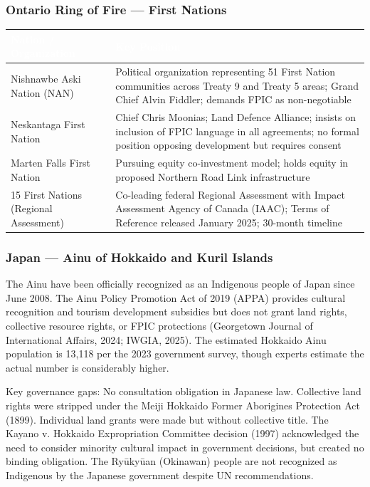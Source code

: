 \documentclass[11pt,letterpaper]{article}
\newcommand{\tableheader}[1]{\textbf{\sffamily\textcolor{white}{#1}}}
\begin{document}
\subsubsection{Ontario Ring of Fire --- First Nations}

\begin{center}
\begin{tabularx}{\textwidth}{L{3.5cm}X}
\toprule
{}
\tableheader{Nation / Organization} & \tableheader{Key Position} \\
\midrule
Nishnawbe Aski Nation (NAN) & Political organization representing 51 First Nation communities across Treaty 9 and Treaty 5 areas; Grand Chief Alvin Fiddler; demands FPIC as non-negotiable \\
Neskantaga First Nation & Chief Chris Moonias; Land Defence Alliance; insists on inclusion of FPIC language in all agreements; no formal position opposing development but requires consent \\
Marten Falls First Nation & Pursuing equity co-investment model; holds equity in proposed Northern Road Link infrastructure \\
15 First Nations (Regional Assessment) & Co-leading federal Regional Assessment with Impact Assessment Agency of Canada (IAAC); Terms of Reference released January 2025; 30-month timeline \\
\bottomrule
\end{tabularx}
\end{center}

\subsubsection{Japan --- Ainu of Hokkaido and Kuril Islands}

The Ainu have been officially recognized as an Indigenous people of Japan since June 2008. The Ainu Policy Promotion Act of 2019 (APPA) provides cultural recognition and tourism development subsidies but does not grant land rights, collective resource rights, or FPIC protections (Georgetown Journal of International Affairs, 2024; IWGIA, 2025). The estimated Hokkaido Ainu population is 13,118 per the 2023 government survey, though experts estimate the actual number is considerably higher.

Key governance gaps: No consultation obligation in Japanese law. Collective land rights were stripped under the Meiji Hokkaido Former Aborigines Protection Act (1899). Individual land grants were made but without collective title. The Kayano v. Hokkaido Expropriation Committee decision (1997) acknowledged the need to consider minority cultural impact in government decisions, but created no binding obligation. The Ryūkyūan (Okinawan) people are not recognized as Indigenous by the Japanese government despite UN recommendations.
\end{document}
